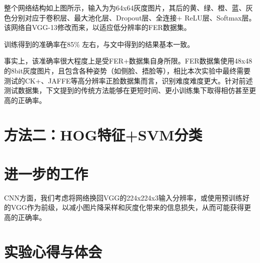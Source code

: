 \documentclass[UTF8]{ctexart}
\begin{document}
整个网络结构如上图所示，输入为为64x64灰度图片，其后的黄、绿、橙、蓝、灰色分别对应于卷积层、最大池化层、Dropout层、全连接+ ReLU层、Softmax层。该网络自VGG-13修改而来，以适应低分辨率的FER数据集。

训练得到的准确率在85\% 左右，与文中得到的结果基本一致。

事实上，该准确率很大程度上是受FER+数据集自身所限。FER数据集使用48x48的8bit灰度图片，且包含各种姿势（如侧脸、捂脸等），相比本次实验中最终需要测试的CK+、JAFFE等高分辨率正脸数据集而言，识别难度难度更大。针对前述测试数据集，下文提到的传统方法能够在更短时间、更小训练集下取得相仿甚至更高的正确率。

\section{方法二：HOG特征+SVM分类}



\section{进一步的工作}

CNN方面，我们考虑将网络换回VGG的224x224x3输入分辨率，或使用预训练好的VGG作为前级，以减小图片降采样和灰度化带来的信息损失，从而可能获得更高的正确率。


\section{实验心得与体会}





\end{document}
